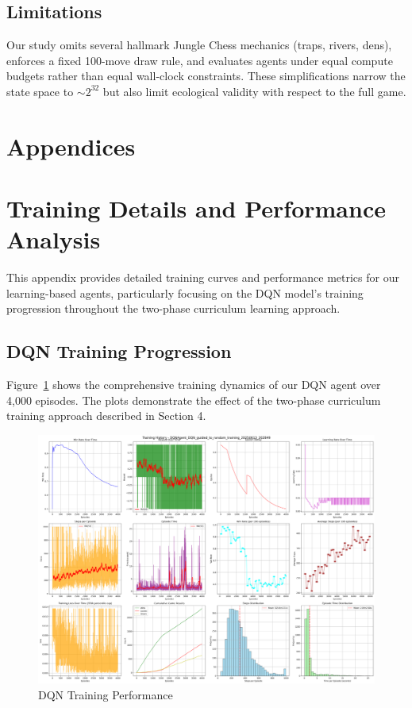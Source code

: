 \documentclass{article}
\begin{document}
\subsection{Limitations}
Our study omits several hallmark Jungle Chess mechanics (traps, rivers, dens), enforces a fixed 100-move draw rule, and evaluates agents under equal compute budgets rather than equal wall-clock constraints.  
These simplifications narrow the state space to ${\sim}2^{32}$ but also limit ecological validity with respect to the full game.

\clearpage
\appendix

\section*{Appendices}

\section{Training Details and Performance Analysis}
\label{sec:training_details}

This appendix provides detailed training curves and performance metrics for our learning-based agents, particularly focusing on the DQN model's training progression throughout the two-phase curriculum learning approach.

\subsection{DQN Training Progression}

Figure~\ref{fig:dqn_training_curves} shows the comprehensive training dynamics of our DQN agent over 4,000 episodes. The plots demonstrate the effect of the two-phase curriculum training approach described in Section 4.

\begin{figure}[H]
    \centering
    \includegraphics[width=1.0\textwidth]{DQNAgent_training_plots.png}
    \caption{DQN Training Performance}
    \label{fig:dqn_training_curves}
\end{figure}
\end{document}
